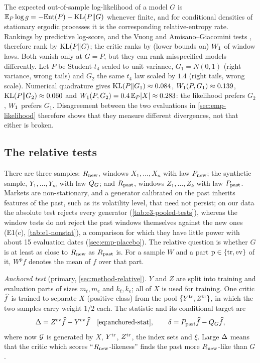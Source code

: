 \begin{remark}\label{rem:kl-vs-w1}
The expected out-of-sample log-likelihood of a model $G$ is $\mathbb{E}_P\log g=-\mathrm{Ent}(P)-\operatorname{KL}(P\Vert G)$
whenever finite, and for conditional densities of stationary ergodic processes it is the
corresponding relative-entropy rate. Rankings by predictive log-score, and the Vuong and
Amisano--Giacomini tests \citep{vuong1989likelihood,amisano2007comparing}, therefore rank by
$\operatorname{KL}(P\Vert G)$; the critic ranks by (lower bounds on) $W_{1}$ of window laws. Both vanish only at
$G=P$, but they can rank misspecified models differently. Let $P$ be Student-$t_4$ scaled to unit
variance, $G_1=N(0,1)$ (right variance, wrong tails) and $G_2$ the same $t_4$ law scaled by $1.4$
(right tails, wrong scale). Numerical quadrature gives $\operatorname{KL}(P\Vert G_1)\approx0.084$,
$W_{1}(P,G_1)\approx0.139$, $\operatorname{KL}(P\Vert G_2)\approx0.060$ and $W_{1}(P,G_2)=0.4\,\mathbb{E}_P\lvert X\rvert\approx0.283$:
the likelihood prefers $G_2$, $W_{1}$ prefers $G_1$. Disagreement between the two evaluations in
\cref{sec:emp-likelihood} therefore shows that they measure different divergences, not that
either is broken.
\end{remark}

\subsection{The relative tests}\label{sec:theory-relative}

There are three samples: $R_{\mathrm{new}}$, windows $X_1,\dots,X_n$ with law $P_{\mathrm{new}}$; the synthetic sample,
$Y_1,\dots,Y_m$ with law $Q_{G}$; and $R_{\mathrm{past}}$, windows $Z_1,\dots,Z_k$ with law $P_{\mathrm{past}}$. Markets
are non-stationary, and a generator calibrated on the past inherits features of the past, such
as its volatility level, that need not persist; on our data the absolute \WC{} test rejects every
generator (\cref{tab:e3-pooled-tests}), whereas the window tests do not reject the past windows
themselves against the new ones (E1(c), \cref{tab:e1-nonstat}), a comparison for which they have
little power with about 15 \TEST{} evaluation dates (\cref{sec:emp-placebo}). The relative question is whether $G$ is at
least as close to $R_{\mathrm{new}}$ as $R_{\mathrm{past}}$ is. For a sample $W$ and a part $\mathrm{p}\in\{\mathrm{tr},\mathrm{ev}\}$
of it, $W^{\mathrm p}f$ denotes the mean of $f$ over that part.

\emph{Anchored test} (primary, \cref{sec:method-relative}). $Y$ and $Z$ are split into training
and evaluation parts of sizes $m_t,m_e$ and $k_t,k_e$; all of $X$ is used for training. One critic
$\widehat{f}$ is trained to separate $X$ (positive class) from the pool $\{Y^{\mathrm{tr}},Z^{\mathrm{tr}}\}$, in which
the two samples carry weight $1/2$ each. The statistic and its conditional target are
\[
  \Delta=Z^{\mathrm{ev}}\widehat{f}-Y^{\mathrm{ev}}\widehat{f}\quad\eqref{eq:anchored-stat},\qquad
  \delta=P_{\mathrm{past}}\widehat{f}-Q_{G}\widehat{f} ,
\]
where now $\mathcal{G}$ is generated by $X$, $Y^{\mathrm{tr}}$, $Z^{\mathrm{tr}}$, the index sets and $\xi$. Large
$\Delta$ means that the critic which scores ``$R_{\mathrm{new}}$-likeness'' finds the past more $R_{\mathrm{new}}$-like
than $G$.

